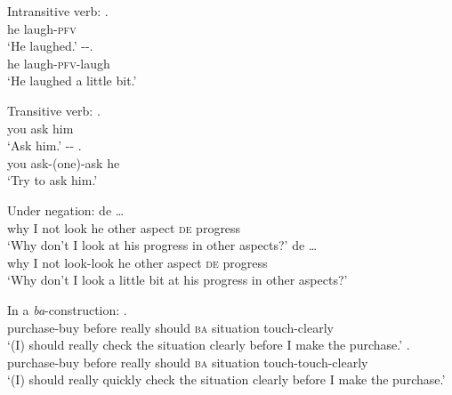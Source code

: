 \settowidth{}
\begin{sloppypar}
\ea\label{ex:syn-vi} Intransitive verb:
		\ea \gll {} .\\
		he laugh-\textsc{pfv}\\
		\glt `He laughed.'
		\ex \gll {} --.\\
		he laugh-\textsc{pfv}-laugh\\
		\glt `He laughed a little bit.'
		\z
        
\ex Transitive verb:
		\ea \gll {}  .\\
		you ask him\\
		\glt `Ask him.'
		\ex \gll {} -- .\\
		you ask-(one)-ask he\\
		\glt `Try to ask him.'
		\z

\ex Under negation:
		\ea \gll {}       de  \ldots\\
		why I not look he other aspect \textsc{de} progress\\
		\glt `Why don't I look at his progress in other aspects?'
		\ex \gll  {}       de \ldots\\
		why I not look-look he other aspect \textsc{de} progress \\ 
		\glt `Why don't I look a little bit at his progress in other aspects?'
		\z

\ex In a \textit{ba}-construction:
		\ea \gll {}      .\\
		purchase-buy before really should \textsc{ba} situation touch-clearly\\
		\glt `(I) should really check the situation clearly before I make the purchase.'
		\ex \gll {}      .\footnotemark\\
		purchase-buy before really should \textsc{ba} situation touch-touch-clearly\\ 
		\glt `(I) should really quickly check the situation clearly before I make the purchase.'
		\z
{}


\end{sloppypar}
